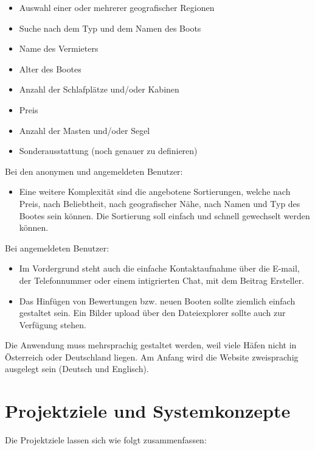 \documentclass[12pt]{article}
\theoremstyle{definition}
\begin{document}
\begin{itemize}
   \item Auswahl einer oder mehrerer geografischer Regionen
   \item Suche nach dem Typ und dem Namen des Boots
   \item Name des Vermieters
   \item Alter des Bootes
   \item Anzahl der Schlafplätze und/oder Kabinen
   \item Preis
   \item Anzahl der Masten und/oder Segel
   \item Sonderausstattung (noch genauer zu definieren)
\end{itemize}

Bei den anonymen und angemeldeten Benutzer:
\begin{itemize}
   \item Eine weitere Komplexität sind die angebotene Sortierungen, welche nach Preis, nach Beliebtheit, nach geografischer Nähe, nach Namen und Typ des Bootes sein können. Die Sortierung soll einfach und schnell gewechselt werden können.
\end{itemize}

Bei angemeldeten Benutzer:

\begin{itemize}
   \item Im Vordergrund steht auch die einfache Kontaktaufnahme über die E-mail, der Telefonnummer oder einem intigrierten Chat, mit dem Beitrag Ersteller.

   \item Das Hinfügen von Bewertungen bzw. neuen Booten sollte ziemlich einfach gestaltet sein. Ein Bilder upload über den Dateiexplorer sollte auch zur Verfügung stehen.
\end{itemize}


Die Anwendung muss mehrsprachig gestaltet werden, weil viele Häfen nicht in Österreich oder Deutschland liegen. Am Anfang wird die Website zweisprachig ausgelegt sein (Deutsch und Englisch).

\pagebreak

\section{Projektziele und Systemkonzepte}
Die Projektziele lassen sich wie folgt zusammenfassen:
\end{document}

